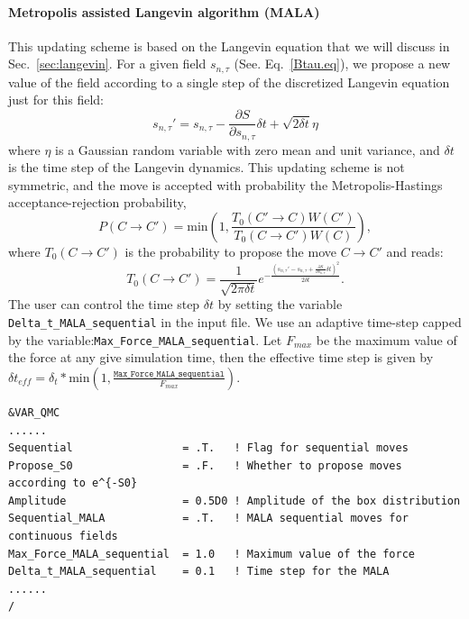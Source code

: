 \paragraph{Metropolis assisted Langevin algorithm (MALA)} \label{sec:sequential_mala}
This updating scheme is based on the Langevin equation  that we will discuss in Sec.~\ref{sec:langevin}.  For  a given field $s_{n,\tau}$ (See. Eq.~\ref{Btau.eq}), we propose a new value of the field according to a single step of the discretized Langevin equation just for this field: 
\begin{equation}
	s_{n,\tau}' = s_{n,\tau} - \frac{\partial S}{\partial s_{n,\tau}} \delta t + \sqrt{ 2 \delta t} \eta
\end{equation}
where $\eta$ is a Gaussian random variable with zero mean and unit variance, and $\delta t$ is the time step of the Langevin dynamics.  This updating scheme is not symmetric, and the move is accepted with probability  the Metropolis-Hastings acceptance-rejection probability,
\begin{equation}P(C \rightarrow C') =  \text{min}  \left( 1, \frac{T_0(C' \rightarrow C) W(C')}{T_0(C \rightarrow C') W(C)} \right),\end{equation}
where $T_0(C \rightarrow C')$ is the probability to propose the move $C \rightarrow C'$ and reads:
\begin{equation}
	T_0(C \rightarrow C') = \frac{1}{\sqrt{2 \pi \delta t}} e^{-\frac{(s_{n,\tau}' - s_{n,\tau} + \frac{\partial S}{\partial s_{n,\tau}} \delta t)^2}{2 \delta t}}.
\end{equation}
The user can control the time step $\delta t$ by setting the variable \texttt{Delta\_t\_MALA\_sequential} in the input file.  
We use an adaptive time-step  capped by the variable:\texttt{Max\_Force\_MALA\_sequential}.  Let $F_{max}$  be the maximum value of the force at any give simulation time, then the effective time step is given by $\delta t_{eff} = \delta_t * \text{min}(1, \frac{\texttt{Max\_Force\_MALA\_sequential}}{F_{max}})$.

\begin{lstlisting}[style=fortran]
&VAR_QMC
......
Sequential                 = .T.   ! Flag for sequential moves
Propose_S0                 = .F.   ! Whether to propose moves according to e^{-S0}
Amplitude                  = 0.5D0 ! Amplitude of the box distribution
Sequential_MALA            = .T.   ! MALA sequential moves for continuous fields
Max_Force_MALA_sequential  = 1.0   ! Maximum value of the force 
Delta_t_MALA_sequential    = 0.1   ! Time step for the MALA 
......
/
\end{lstlisting}

